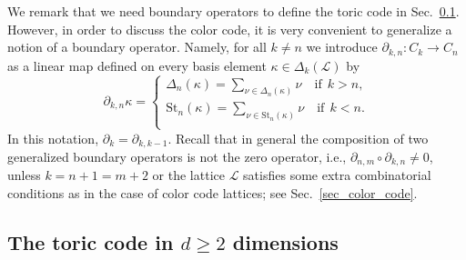 \documentclass[onecolumn,letterpaper,11pt,accepted=2022-12-19]{quantumarticle}
\newcommand{\face}[2]{{\Delta_{#1}(#2)}}
\renewcommand{\star}[2]{{\mathrm{St}_{#1}(#2)}}
\newcommand{\bnd}[2]{\partial_{#1,#2}}
\theoremstyle{definition}
\theoremstyle{lemma}
\theoremstyle{theorem}
\theoremstyle{corollary}
\begin{document}
We remark that we need boundary operators to define the toric code in Sec.~\ref{sec_toric_code}.
However, in order to discuss the color code, it is very convenient to generalize a notion of a boundary operator.
Namely, for all $k \neq n$ we introduce $\bnd k n : C_k \rightarrow C_n$ as a linear map defined on every basis element $\kappa\in \face k {\mathcal{L}}$ by
\begin{equation}
\bnd k n \kappa =
\begin{cases}
\face{n}{\kappa} = \sum_{\nu\in\face{n}{\kappa}} \nu \quad\textrm{if}\ \ k>n,\\
\star{n}{\kappa} = \sum_{\nu\in\star{n}{\kappa}} \nu \quad\textrm{if}\ \ k<n.\\
\end{cases}
\end{equation}
In this notation, $\partial_k = \bnd{k}{k-1}$.
Recall that in general the composition of two generalized boundary operators is not the zero operator, i.e., $\bnd n m \circ \bnd k n \neq 0$, unless $k = n+1 = m + 2$ or the lattice $\mathcal{L}$ satisfies some extra combinatorial conditions as in the case of color code lattices; see Sec.~\ref{sec_color_code}.



\subsection{The toric code in $d\geq 2$ dimensions}
\label{sec_toric_code}
\end{document}
